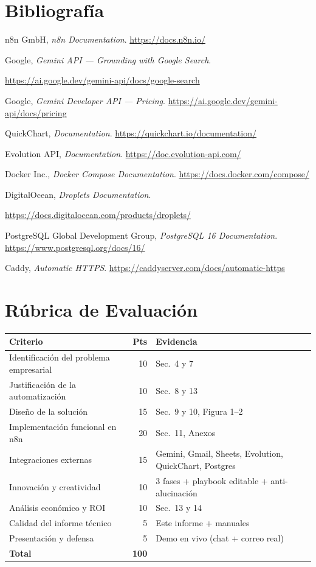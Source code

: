\documentclass[11pt,a4paper]{article}
\begin{document}
\section{Bibliografía}
\begin{enumerate}[leftmargin=2.2em,label={[\arabic*]}]
\item n8n GmbH, \emph{n8n Documentation}. \url{https://docs.n8n.io/}
\item Google, \emph{Gemini API --- Grounding with Google Search}.\par \url{https://ai.google.dev/gemini-api/docs/google-search}
\item Google, \emph{Gemini Developer API --- Pricing}. \url{https://ai.google.dev/gemini-api/docs/pricing}
\item QuickChart, \emph{Documentation}. \url{https://quickchart.io/documentation/}
\item Evolution API, \emph{Documentation}. \url{https://doc.evolution-api.com/}
\item Docker Inc., \emph{Docker Compose Documentation}. \url{https://docs.docker.com/compose/}
\item DigitalOcean, \emph{Droplets Documentation}.\par \url{https://docs.digitalocean.com/products/droplets/}
\item PostgreSQL Global Development Group, \emph{PostgreSQL 16 Documentation}. \url{https://www.postgresql.org/docs/16/}
\item Caddy, \emph{Automatic HTTPS}. \url{https://caddyserver.com/docs/automatic-https}
\end{enumerate}

\section{Rúbrica de Evaluación}
\renewcommand{\arraystretch}{1.25}
\begin{longtable}{L{7.5cm} r L{5cm}}
\toprule \textbf{Criterio} & \textbf{Pts} & \textbf{Evidencia}\\ \midrule \endhead
Identificación del problema empresarial & 10 & Sec.~4 y 7\\
Justificación de la automatización & 10 & Sec.~8 y 13\\
Diseño de la solución & 15 & Sec.~9 y 10, Figura 1--2\\
Implementación funcional en n8n & 20 & Sec.~11, Anexos\\
Integraciones externas & 15 & Gemini, Gmail, Sheets, Evolution, QuickChart, Postgres\\
Innovación y creatividad & 10 & 3 fases + playbook editable + anti-alucinación\\
Análisis económico y ROI & 10 & Sec.~13 y 14\\
Calidad del informe técnico & 5 & Este informe + manuales\\
Presentación y defensa & 5 & Demo en vivo (chat + correo real)\\
\midrule \textbf{Total} & \textbf{100} & \\
\bottomrule
\end{longtable}
\end{document}
